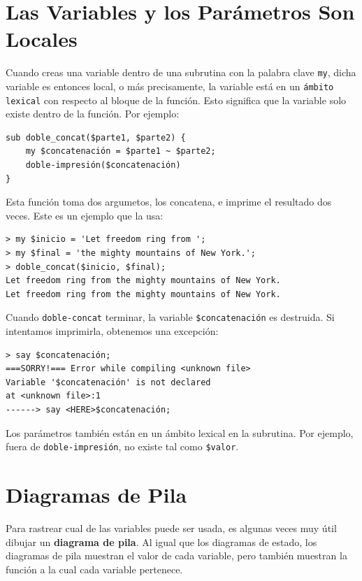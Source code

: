 \section{Las Variables y los Parámetros Son Locales}
\label{localvar}

Cuando creas una variable dentro de una subrutina con 
la palabra clave {\tt my}, dicha variable es entonces 
local, o más precisamente, la variable está en un {\tt ámbito
lexical} con respecto al bloque de la función. Esto significa
que la variable solo existe dentro de la función. Por ejemplo:

\begin{lstlisting}
sub doble_concat($parte1, $parte2) {
    my $concatenación = $parte1 ~ $parte2;
    doble-impresión($concatenación)
}
\end{lstlisting}
%
Esta función toma dos argumetos, los concatena, e imprime
el resultado dos veces. Este es un ejemplo que la usa:

\begin{lstlisting}
> my $inicio = 'Let freedom ring from ';
> my $final = 'the mighty mountains of New York.';
> doble_concat($inicio, $final);
Let freedom ring from the mighty mountains of New York.
Let freedom ring from the mighty mountains of New York.
\end{lstlisting}
%
Cuando \verb|doble-concat| terminar, la variable \verb|$concatenación|
es destruida. Si intentamos imprimirla, obtenemos una excepción:

\begin{lstlisting}
> say $concatenación;
===SORRY!=== Error while compiling <unknown file>
Variable '$concatenación' is not declared
at <unknown file>:1
------> say <HERE>$concatenación;
\end{lstlisting}
%
Los parámetros también están en un ámbito lexical
en la subrutina. Por ejemplo, fuera de \verb|doble-impresión|, 
no existe tal como \verb|$valor|.


\section{Diagramas de Pila}
\label{stackdiagram}

Para rastrear cual de las variables puede ser usada, es algunas veces
muy útil dibujar un {\bf diagrama de pila}. Al igual que los diagramas de
estado, los diagramas de pila muestran el valor de cada variable, pero
también muestran la función a la cual cada variable pertenece.

